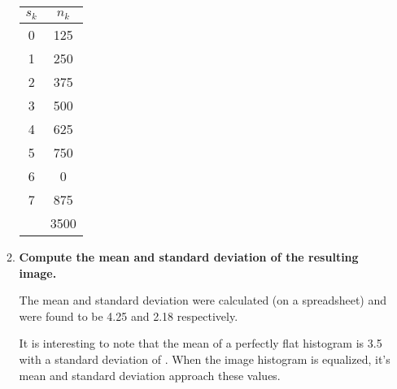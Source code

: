 \begin{enumerate}[font=\bfseries]
\begin{enumerate}[font=\bfseries, label=\alph*.]
	\begin{table}[H]
	    \centering
	    \begin{tabular}{|c|c|} \hline
	    $s_k$ & $n_k$ \\ \hline
	    0 & 125  \\ \hline
	    1 & 250  \\ \hline
	    2 & 375  \\ \hline
	    3 & 500  \\ \hline
	    4 & 625  \\ \hline
	    5 & 750  \\ \hline
	    6 & 0    \\ \hline
	    7 & 875  \\ \hline
	      & 3500 \\ \hline
	    \end{tabular}
	\end{table}

	\item \textbf{Compute the mean and standard deviation of the resulting
	image.}
	
	The mean and standard deviation were calculated (on a spreadsheet) and
	were found to be 4.25 and 2.18 respectively.

	It is interesting to note that the mean of a perfectly flat histogram is
	3.5 with a standard deviation of . When the image histogram is
	equalized, it's mean and standard deviation approach these values.

    \end{enumerate}

\end{enumerate}
